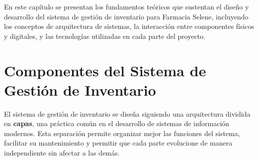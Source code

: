 
En este capítulo se presentan los fundamentos teóricos que sustentan el diseño y desarrollo del sistema de gestión de inventario para Farmacia Selene, incluyendo los conceptos de arquitectura de sistemas, la interacción entre componentes físicos y digitales, y las tecnologías utilizadas en cada parte del proyecto.









\section{Componentes del Sistema de Gestión de Inventario}

El sistema de gestión de inventario se diseña siguiendo una arquitectura dividida en \textbf{capas}, una práctica común en el desarrollo de sistemas de información modernos. Esta separación permite organizar mejor las funciones del sistema, facilitar su mantenimiento y permitir que cada parte evolucione de manera independiente sin afectar a las demás.


